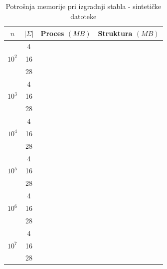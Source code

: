 \documentclass[times, utf8, seminar, numeric]{fer}
\begin{document}
\begin{table}[h]
\caption{Potrošnja memorije pri izgradnji stabla - sintetičke datoteke}
\centering
  \begin{tabular}{c|c|c|c|c|c}
    $n$ & $|\Sigma|$ &
    \multicolumn{2}{c|}{Proces $(MB)$} & \multicolumn{2}{c}{Struktura $(MB)$} \\ \hline
    \multirow{3}{*}{$10^2$}
      & \num{4} & \num{} & \num{} & \num{} & \num{} \\
      & \num{16} & \num{} & \num{} & \num{} & \num{} \\
      & \num{28} & \num{} & \num{} & \num{} & \num{} \\
    \hline
    \multirow{3}{*}{$10^3$}
      & \num{4} & \num{} & \num{} & \num{} & \num{} \\
      & \num{16} & \num{} & \num{} & \num{} & \num{} \\
      & \num{28} & \num{} & \num{} & \num{} & \num{} \\
    \hline
    \multirow{3}{*}{$10^4$}
      & \num{4} & \num{} & \num{} & \num{} & \num{} \\
      & \num{16} & \num{} & \num{} & \num{} & \num{} \\
      & \num{28} & \num{} & \num{} & \num{} & \num{} \\
    \hline
    \multirow{3}{*}{$10^5$}
      & \num{4} & \num{} & \num{} & \num{} & \num{} \\
      & \num{16} & \num{} & \num{} & \num{} & \num{} \\
      & \num{28} & \num{} & \num{} & \num{} & \num{} \\
    \hline
    \multirow{3}{*}{$10^6$}
      & \num{4} & \num{} & \num{} & \num{} & \num{} \\
      & \num{16} & \num{} & \num{} & \num{} & \num{} \\
      & \num{28} & \num{} & \num{} & \num{} & \num{} \\
    \hline
    \multirow{3}{*}{$10^7$}
      & \num{4} & \num{} & \num{} & \num{} & \num{} \\
      & \num{16} & \num{} & \num{} & \num{} & \num{} \\
      & \num{28} & \num{} & \num{} & \num{} & \num{} \\
  \end{tabular}
\end{table}
\end{document}
